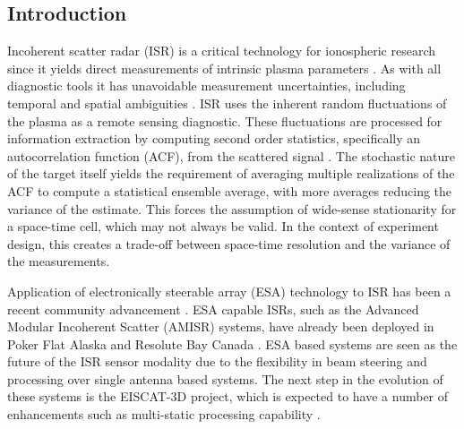 \documentclass[draft,ras]{agutex}
\begin{document}
%
%

%

\begin{article}

\section{Introduction}


Incoherent scatter radar (ISR) is a critical technology for ionospheric research since it yields direct measurements of intrinsic plasma parameters  \citep{dougherty:farley1960, farleydougherty:ISR2, doughteryfarley:ISR3, hagfors1961}. As with all diagnostic tools it has unavoidable measurement uncertainties, including temporal and spatial ambiguities \citep{farley1969,farleycomppower1969,Woodman:1991is,hysell2008,RDS:RDS20236}.  ISR uses the inherent random fluctuations of the plasma as a remote sensing diagnostic. These fluctuations are processed for information extraction by computing second order statistics, specifically an autocorrelation function (ACF), from the scattered signal \citep{farley1969}. The stochastic nature of the target itself yields the requirement of averaging multiple realizations of the ACF to compute a statistical ensemble average, with more averages reducing the variance of the estimate. This forces the assumption of wide-sense stationarity for a space-time cell, which may not always be valid. In the context of experiment design, this creates a trade-off between space-time resolution and the variance of the measurements.

Application of electronically steerable array (ESA) technology to ISR has been a recent community advancement \citep{kelly:pfisr2009}. ESA capable ISRs, such as the Advanced Modular Incoherent Scatter (AMISR) systems, have already been deployed in Poker Flat Alaska and Resolute Bay Canada \citep{Nicolls:2007ie, dahlgren2012di}. ESA based systems are seen as the future of the ISR sensor modality due to the flexibility in beam steering and processing over single antenna based systems. The next step in the evolution of these systems is the EISCAT-3D project, which is expected to have a number of enhancements such as multi-static processing capability \citep{turunen:eiscat3d2009}.


\end{article}
\end{document}
